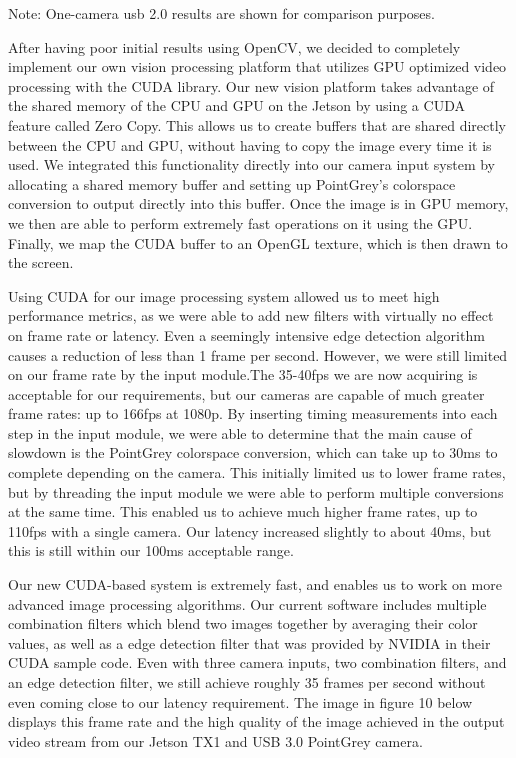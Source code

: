 \documentclass[letterpaper,10pt,titlepage]{IEEEtran}
\begin{document}
\par
Note: One-camera usb 2.0 results are shown for comparison purposes.\\
\par
After having poor initial results using OpenCV, we decided to completely implement our own vision processing platform that utilizes GPU optimized video processing with the CUDA library. Our new vision platform takes advantage of the shared memory of the CPU and GPU on the Jetson by using a CUDA feature called Zero Copy. This allows us to create buffers that are shared directly between the CPU and GPU, without having to copy the image every time it is used. We integrated this functionality directly into our camera input system by allocating a shared memory buffer and setting up PointGrey's colorspace conversion to output directly into this buffer. Once the image is in GPU memory, we then are able to perform extremely fast operations on it using the GPU. Finally, we map the CUDA buffer to an OpenGL texture, which is then drawn to the screen.\\
\par
Using CUDA for our image processing system allowed us to meet high performance metrics, as we were able to add new filters with virtually no effect on frame rate or latency. Even a seemingly intensive edge detection algorithm causes a reduction of less than 1 frame per second. However, we were still limited on our frame rate by the input module.The 35-40fps we are now acquiring is acceptable for our requirements, but our cameras are capable of much greater frame rates: up to 166fps at 1080p. By inserting timing measurements into each step in the input module, we were able to determine that the main cause of slowdown is the PointGrey colorspace conversion, which can take up to 30ms to complete depending on the camera. This initially limited us to lower frame rates, but by threading the input module we were able to perform multiple conversions at the same time. This enabled us to achieve much higher frame rates, up to 110fps with a single camera. Our latency increased slightly to about 40ms, but this is still within our 100ms acceptable range.\\
\par
Our new CUDA-based system is extremely fast, and enables us to work on more advanced image processing algorithms. Our current software includes multiple combination filters which blend two images together by averaging their color values, as well as a edge detection filter that was provided by NVIDIA in their CUDA sample code. Even with three camera inputs, two combination filters, and an edge detection filter, we still achieve roughly 35 frames per second without even coming close to our latency requirement. The image in figure 10 below displays this frame rate and the high quality of the image achieved in the output video stream from our Jetson TX1 and USB 3.0 PointGrey camera.\\
\end{document}
